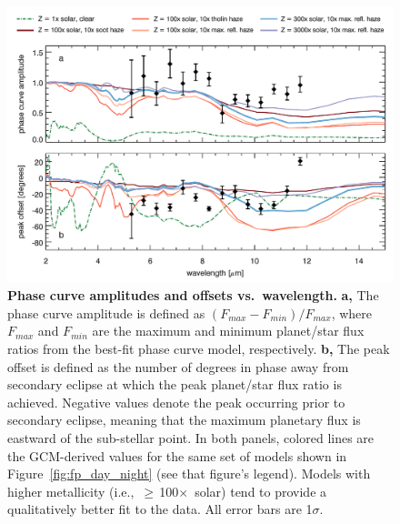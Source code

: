 \documentclass[pdflatex,sn-standardnature]{sn-jnl}%
\begin{document}
\begin{figure}[h]
    \centering
    \includegraphics[width=1.0\textwidth]{amp_offset.pdf}
    \caption{\textbf{Phase curve amplitudes and offsets vs.\ wavelength.} \textbf{a,} The phase curve amplitude is defined as $(F_{max} - F_{min}) / F_{max}$, where $F_{max}$ and $F_{min}$ are the maximum and minimum planet/star flux ratios from the best-fit phase curve model, respectively.  \textbf{b,} The peak offset is defined as the number of degrees in phase away from secondary eclipse at which the peak planet/star flux ratio is achieved. Negative values denote the peak occurring prior to secondary eclipse, meaning that the maximum planetary flux is eastward of the sub-stellar point.  In both panels, colored lines are the GCM-derived values for the same set of models shown in Figure~\ref{fig:fp_day_night} (see that figure's legend).  Models with higher metallicity \mbox{(i.e., $\geq$\,100$\times$ solar)} tend to provide a qualitatively better fit to the data. All error bars are 1$\sigma$.}
    \label{fig:amp_offset} 
\end{figure}
\end{document}
